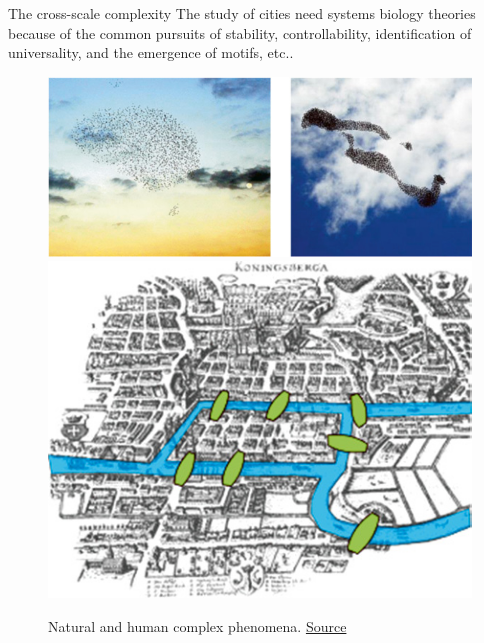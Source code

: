 \begin{frame}{The cross-scale complexity}
    The study of cities need systems biology theories because of the common pursuits of stability, controllability, identification of universality, and the emergence of motifs, etc..
    \begin{figure}
        \centering
        \includegraphics[width = 0.6\linewidth]{Pics/swarm.jpg}
        \includegraphics[width = 0.33\linewidth]{Pics/7bridge.jpg}
        \caption{Natural and human complex phenomena. \href{https://link.springer.com/book/10.1007/978-3-319-02024-2}{Source}}
        \label{fig:nathum}
    \end{figure}
\end{frame}
